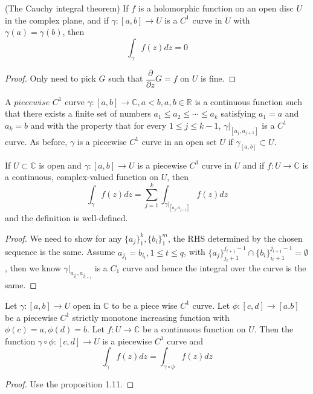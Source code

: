 \documentclass[lang=en, color=blue, ]{elegantbook}
\newcommand{\R}{\mathbb{R}}
\newcommand{\C}{\mathbb{C}}
\newcommand{\ParZ}{\dfrac{\partial}{\partial z}}
\begin{document}
\begin{theorem}
    (The Cauchy integral theorem) If $f$ is a holomorphic function on an open disc $U$ in the complex plane, and if $\gamma:[a,b] \to U$ is a $C^1$ curve in $U$ with $\gamma(a) = \gamma(b)$, then
    \[\int_{\gamma} f(z)dz = 0\]
\end{theorem}
\begin{proof}
Only need to pick $G$ such that $\ParZ G = f$ on $U$ is fine.
\end{proof}

\begin{definition}
    A $piecewise$ $C^1$ curve $\gamma:[a,b]\to\C, a<b,a,b\in\R$ is a continuous function such that there exists a finite set of numbers $a_1\leq a_2 \leq \cdots \leq a_k$ satisfying $a_1=a$ and $a_k=b$ and with the property that for every $1\leq j \leq k-1$, $\gamma|_{[a_j,a_{j+1}]}$ is a $C^1$ curve. As before, $\gamma$ is a piecewise $C^1$ curve in an open set $U$ if $\gamma_{[a,b]}\subset U$.
\end{definition}

\begin{definition}
    If $U\subset \C$ is open and $\gamma:[a,b]\to U$ is a piecewise $C^1$ curve in $U$ and if $f:U\to\C$ is a continuous, complex-valued function on $U$, then
    \[
    \int_{\gamma} f(z)dz = \sum\limits_{j=1}^k \int_{\gamma|_{[a_j,a_{j+1}]}} f(z)dz
    \]
    and the definition is well-defined.
\end{definition}
\begin{proof}\par
    We need to show for any $\{a_j\}_1^k,\{b_i\}_1^m$, the RHS determined by the chosen sequence is the same. Assume $a_{j_t} = b_{i_t}, 1\leq t \leq q$, with $\{a_j\}_{j_t+1}^{j_{t+1}-1} \cap \{b_i\}_{i_t+1}^{j_{i+1}-1} = \emptyset$, then we know $\gamma|_{a_{j_t},a_{j_{t+1}}}$ is a $C_1$ curve and hence the integral over the curve is the same.
\end{proof}

\begin{lemma}
    Let $\gamma:[a,b]\to U$ open in $\C$ to be a piece wise $C^1$ curve. Let $\phi:[c,d]\to [a.b]$ be a piecewise $C^1$ strictly monotone increasing function with $\phi(c) = a, \phi(d) = b$. Let $f:U\to \C$ be a continuous function on $U$. Then the function $\gamma\circ \phi:[c,d]\to U$ is a piecewise $C^1$ curve and
    \[
        \int_{\gamma} f(z)dz = \int_{\gamma\circ\phi} f(z)dz
    \]
\end{lemma}
\begin{proof}
    Use the proposition 1.11.
\end{proof}
\end{document}
